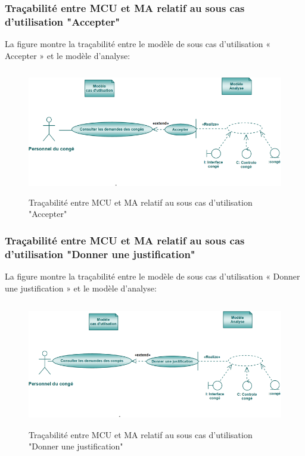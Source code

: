 \documentclass[12 pt ]{report}
\begin{document}
\subsubsection{Traçabilité entre MCU et MA relatif au sous cas d’utilisation "Accepter" }
La figure  montre la traçabilité entre le modèle de sous cas d’utilisation « Accepter » et le modèle d’analyse:
\begin{figure}[h]
\begin{center}
\includegraphics[width= 12cm , height =5.5cm]{acc.PNG}
\caption{Traçabilité entre MCU et MA relatif au sous cas d’utilisation "Accepter"}
\end{center}
\end{figure}
\subsubsection{Traçabilité entre MCU et MA relatif au sous cas d’utilisation "Donner une justification" }
La figure  montre la traçabilité entre le modèle de sous cas d’utilisation « Donner une justification » et le modèle d’analyse:
\begin{figure}[h]
\begin{center}
\includegraphics[width= 12cm , height =5.5cm]{don.PNG}
\caption{Traçabilité entre MCU et MA relatif au sous cas d’utilisation "Donner une justification"}
\end{center}
\end{figure}
\end{document}
